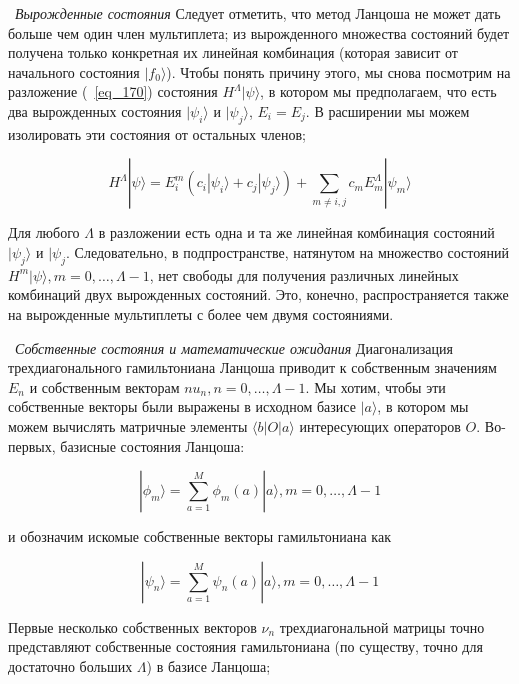 \documentclass[11pt]{article}
\begin{document}
~\emph{Вырожденные состояния}
Следует отметить, что метод Ланцоша не может дать больше чем один член мультиплета; из вырожденного множества состояний будет получена только конкретная их линейная комбинация (которая зависит от начального состояния $| f_0 \rangle$).
 Чтобы понять причину этого, мы снова посмотрим на разложение (~\ref{eq_170}) состояния $H^{\Lambda} | \psi \rangle $, в котором мы предполагаем, что есть два  вырожденных состояния $| \psi_i \rangle $ и $| \psi_j \rangle $, $E_i = E_j$. В расширении мы можем изолировать эти состояния от остальных членов;

\begin{equation}
H^{\Lambda} | \psi \rangle = E_i^m(c_i|\psi_i \rangle +c_j|\psi_j \rangle) + \sum\limits_{m \ne i,j}c_mE_m^{\Lambda}|\psi_m \rangle
\label{eq_187}
\end{equation}

Для любого $\Lambda$ в разложении есть одна и та же линейная комбинация состояний $| \psi_j \rangle$ и $| \psi_j $. Следовательно, в подпространстве, натянутом на множество состояний $H^m | \psi \rangle, m = 0, \dots, \Lambda - 1$, нет свободы для получения различных линейных комбинаций двух вырожденных состояний. Это, конечно, распространяется также на вырожденные мультиплеты с более чем двумя состояниями.

~\emph{Собственные состояния и математические ожидания}
Диагонализация трехдиагонального гамильтониана Ланцоша приводит к собственным значениям $E_n$ и собственным векторам $nu_n, n = 0,\dots, \Lambda - 1$. Мы хотим, чтобы эти собственные векторы были выражены в исходном базисе {$|a \rangle$}, в котором мы можем вычислять матричные элементы $\langle b | O | a \rangle$ интересующих операторов $O$. Во-первых, базисные состояния Ланцоша:

\begin{equation}
|\phi_m \rangle = \sum\limits_{a=1}^{M}\phi_m(a)|a \rangle, m = 0, \dots, \Lambda-1
\label{eq_189}
\end{equation}

и обозначим искомые собственные векторы гамильтониана как

\begin{equation}
|\psi_n \rangle = \sum\limits_{a=1}^{M}\psi_n (a)|a \rangle, m = 0, \dots, \Lambda-1
\label{eq_190}
\end{equation}

Первые несколько собственных векторов $\nu_n$ трехдиагональной матрицы точно представляют собственные состояния гамильтониана (по существу, точно для достаточно больших $\Lambda$) в базисе Ланцоша;
\end{document}
